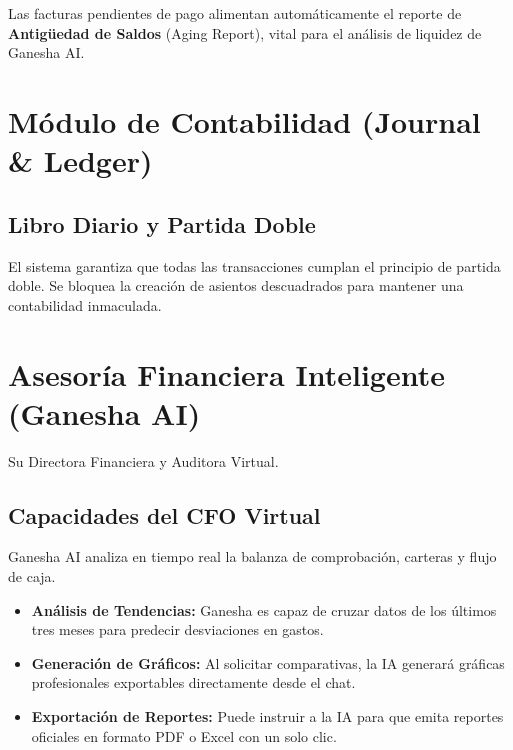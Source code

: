 \documentclass[a4paper,12pt]{article}
\begin{document}
\begin{tcolorbox}[colback=brandorange!10, colframe=brandorange, title=Gestión de Cartera]
    Las facturas pendientes de pago alimentan automáticamente el reporte de \textbf{Antigüedad de Saldos} (Aging Report), vital para el análisis de liquidez de Ganesha AI.
\end{tcolorbox}

\section{Módulo de Contabilidad (Journal \& Ledger)}
\subsection{Libro Diario y Partida Doble}
El sistema garantiza que todas las transacciones cumplan el principio de partida doble. Se bloquea la creación de asientos descuadrados para mantener una contabilidad inmaculada.

\section{Asesoría Financiera Inteligente (Ganesha AI)}
Su Directora Financiera y Auditora Virtual.

\subsection{Capacidades del CFO Virtual}
Ganesha AI analiza en tiempo real la balanza de comprobación, carteras y flujo de caja.
\begin{itemize}
    \item \textbf{Análisis de Tendencias:} Ganesha es capaz de cruzar datos de los últimos tres meses para predecir desviaciones en gastos.
    \item \textbf{Generación de Gráficos:} Al solicitar comparativas, la IA generará gráficas profesionales exportables directamente desde el chat.
    \item \textbf{Exportación de Reportes:} Puede instruir a la IA para que emita reportes oficiales en formato PDF o Excel con un solo clic.
\end{itemize}
\end{document}
